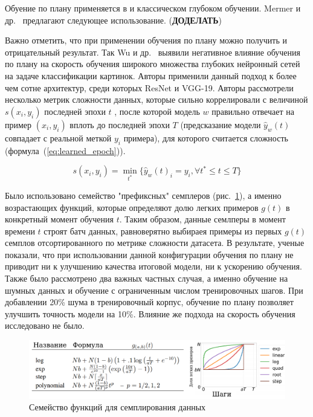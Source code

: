 \documentclass{spbau-diploma}
\begin{document}
Обуение по плану применяется в и классическом глубоком обучении. Mermer и др.~\cite{mermer2017scalable} предлагают следующее использование. ({\bf ДОДЕЛАТЬ})

Важно отметить, что при применении обучения по плану можно получить и отрицательный результат. Так Wu и др.~\cite{wu2020curricula} выявили негативное влияние обучения по плану на скорость обучения широкого множества глубоких нейронный сетей на задаче классификации картинок. Авторы применили данный подход к более чем сотне архитектур, среди которых ResNet и VGG-19. Авторы рассмотрели несколько метрик сложности данных, которые сильно коррелировали с величиной $s(x_i, y_i)$ последней эпохи $t$	, после которой модель $w$ правильно отвечает на пример $(x_i, y_i)$ вплоть до последней эпохи $T$ (предсказание модели $\hat{y}_w(t)$ совпадает с реальной меткой $y_i$ примера), для которого считается сложность (формула~(\ref{eq:learned_epoch})). 

\begin{equation} \label{eq:learned_epoch}
s(x_i, y_i) = \min_{t^*}\{\hat{y}_w(t)_i = y_i,\forall t^* \le t \le T\}
\end{equation}

Было использовано семейство "префиксных" семплеров (рис.~\ref{fig:cv_pacing_functions}), а именно возрастающих функций, которые определяют долю легких примеров $g(t)$ в конкретный момент обучения $t$. Таким образом, данные семлперы в момент времени $t$ строят батч данных, равноверятно выбираея примеры из первых $g(t)$ семплов отсортированного по метрике сложности датасета. В результате, ученые показали, что при использовании данной конфигурации обучения по плану не приводит ни к улучшению качества итоговой модели, ни к ускорению обучения. Также было рассмотрено два важных частных случая, а именно обучение на шумных данных и обучение с ограниченным числом тренировочных шагов. При добавлении 20\% шума в тренировочный корпус, обучение по плану позволяет улучшить точность модели на 10\%. Влияние же подхода на скорость обучения исследовано не было.

\begin{figure}[h]
	\centering
	\includegraphics[scale=0.48]{CV_pacing_functions}
	\caption{Семейство функций для семплирования данных}
	\label{fig:cv_pacing_functions}
\end{figure}
\end{document}
